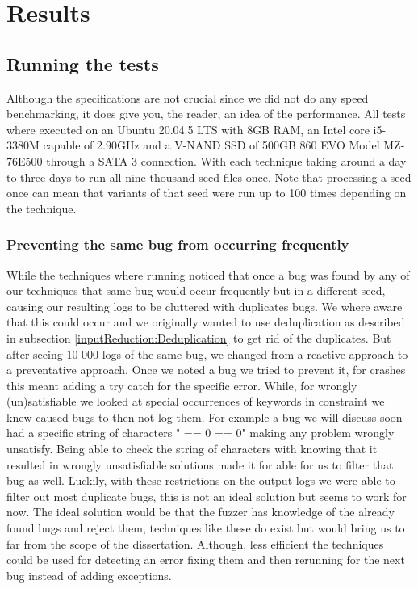\chapter{Results}
\label{cha:res}
\label{res:Intro}

\section{Running the tests}
\label{res:RunningTests}
\label{res:Specs}
Although the specifications are not crucial since we did not do any speed benchmarking, it does give you, the reader, an idea of the performance. All tests where executed on an Ubuntu 20.04.5 LTS with 8GB RAM, an Intel core i5-3380M capable of 2.90GHz and a V-NAND SSD of 500GB 860 EVO Model MZ-76E500 through a SATA 3 connection. With each technique taking around a day to three days to run all nine thousand seed files once. Note that processing a seed once can mean that variants of that seed were run up to 100 times depending on the technique.


\subsection{Preventing the same bug from occurring frequently}
While the techniques where running noticed that once a bug was found by any of our techniques that same bug would occur frequently but in a different seed, causing our resulting logs to be cluttered with duplicates bugs. We where aware that this could occur and we originally wanted to use deduplication as described in subsection \ref{inputReduction:Deduplication} to get rid of the duplicates. But after seeing 10 000 logs of the same bug, we changed from a reactive approach to a preventative approach. Once we noted a bug we tried to prevent it, for crashes this meant adding a try catch for the specific error. While, for wrongly (un)satisfiable we looked at special occurrences of keywords in constraint we knew caused bugs to then not log them. For example a bug we will discuss soon had a specific string of characters " == 0 == 0" making any problem wrongly unsatisfy. Being able to check the string of characters with knowing that it resulted in wrongly unsatisfiable  solutions made it for able for us to filter that bug as well. Luckily, with these restrictions on the output logs we were able to filter out most duplicate bugs, this is not an ideal solution but seems to work for now. The ideal solution would be that the fuzzer has knowledge of the already found bugs and reject them, techniques like these do exist but would bring us to far from the scope of the dissertation. Although, less efficient the techniques could be used for detecting an error fixing them and then rerunning for the next bug instead of adding exceptions.

